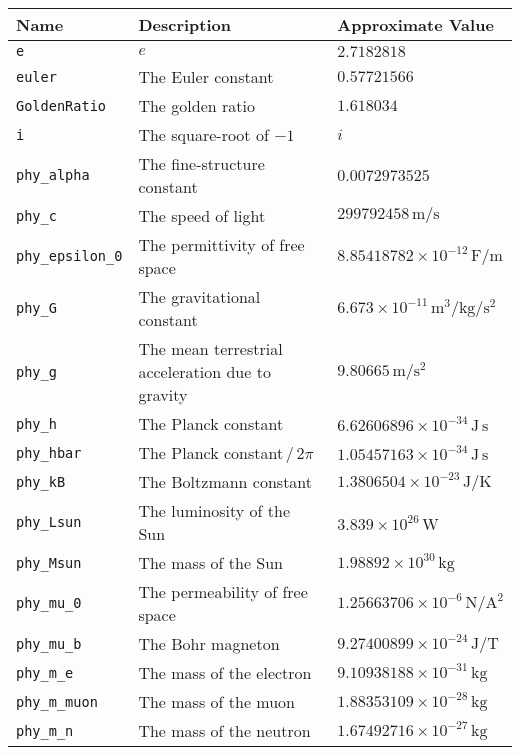 \begin{landscape}
\begin{center}
\begin{longtable}{|lll|}
\hline \endfoot
\hline
{\bf Name} & {\bf Description} & {\bf Approximate Value} \\ \hline \endhead
{\tt e} & $e$ & $2.7182818$ \\
{\tt euler} & The Euler constant & $0.57721566$ \\
{\tt GoldenRatio} & The golden ratio & $1.618034$ \\
{\tt i} & The square-root of $-1$ & $i$ \\
{\tt phy\_alpha} & The fine-structure constant & $0.0072973525$ \\
{\tt phy\_c} & The speed of light & $299792458\,\mathrm{m}/\mathrm{s}$ \\
{\tt phy\_epsilon\_0} & The permittivity of free space & $8.85418782\times10^{-12}\,\mathrm{F}/\mathrm{m}$ \\
{\tt phy\_G} & The gravitational constant & $6.673\times10^{-11}\,\mathrm{m}^3/\mathrm{kg}/\mathrm{s}^{2}$ \\
{\tt phy\_g} & The mean terrestrial acceleration due to gravity & $9.80665\,\mathrm{m}/\mathrm{s}^{2}$ \\
{\tt phy\_h} & The Planck constant & $6.62606896\times10^{-34}\,\mathrm{J}\,\mathrm{s}$ \\
{\tt phy\_hbar} & The Planck constant$\,/\,2\pi$ & $1.05457163\times10^{-34}\,\mathrm{J}\,\mathrm{s}$ \\
{\tt phy\_kB} & The Boltzmann constant & $1.3806504\times10^{-23}\,\mathrm{J}/\mathrm{K}$ \\
{\tt phy\_Lsun} & The luminosity of the Sun & $3.839\times10^{26}\,\mathrm{W}$ \\
{\tt phy\_Msun} & The mass of the Sun & $1.98892\times10^{30}\,\mathrm{kg}$ \\
{\tt phy\_mu\_0} & The permeability of free space & $1.25663706\times10^{-6}\,\mathrm{N}/\mathrm{A}^{2}$ \\
{\tt phy\_mu\_b} & The Bohr magneton & $9.27400899\times10^{-24}\,\mathrm{J}/\mathrm{T}$ \\
{\tt phy\_m\_e} & The mass of the electron & $9.10938188\times10^{-31}\,\mathrm{kg}$ \\
{\tt phy\_m\_muon} & The mass of the muon & $1.88353109\times10^{-28}\,\mathrm{kg}$ \\
{\tt phy\_m\_n} & The mass of the neutron & $1.67492716\times10^{-27}\,\mathrm{kg}$ \\

\end{longtable}
\end{center}
\end{landscape}
